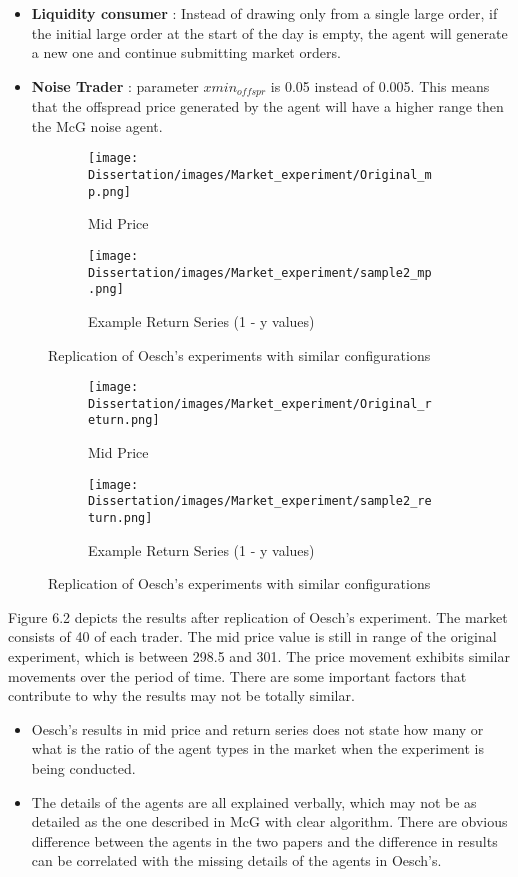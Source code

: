 \begin{itemize}
  \item \textbf{Liquidity consumer} : Instead of drawing only from a single large order, if the initial large order at the start of the day is empty, the agent will generate a new one and continue submitting market orders. 
  \item \textbf{Noise Trader} : parameter $xmin_{offspr}$ is 0.05 instead of 0.005. This means that the offspread price generated by the agent will have a higher range then the McG noise agent. 
\end{itemize}

\begin{figure}[h]
  \begin{subfigure}[b]{0.5\textwidth}
    \texttt{[image: Dissertation/images/Market\_experiment/Original\_mp.png]}
    \caption{Mid Price}
    \label{fig:1}
  \end{subfigure}
  \begin{subfigure}[b]{0.5\textwidth}
    \texttt{[image: Dissertation/images/Market\_experiment/sample2\_mp.png]}
    \caption{Example Return Series (1 - y values)}
    \label{fig:2}
  \end{subfigure}
\caption{Replication of Oesch's experiments with similar configurations} 
\end{figure}

\begin{figure}[h]
  \begin{subfigure}[b]{0.5\textwidth}
    \texttt{[image: Dissertation/images/Market\_experiment/Original\_return.png]}
    \caption{Mid Price}
    \label{fig:1}
  \end{subfigure}
  \begin{subfigure}[b]{0.5\textwidth}
    \texttt{[image: Dissertation/images/Market\_experiment/sample2\_return.png]}
    \caption{Example Return Series (1 - y values)}
    \label{fig:2}
  \end{subfigure}
\caption{Replication of Oesch's experiments with similar configurations} 
\end{figure}

Figure 6.2 depicts the results after replication of Oesch's experiment. The market consists of 40 of each trader. The mid price value is still in range of the original experiment, which is between 298.5 and 301. The price movement exhibits similar movements over the period of time. There are some important factors that contribute to why the results may not be totally similar. 

\begin{itemize}
  \item Oesch's results in mid price and return series does not state how many or what is the ratio of the agent types in the market when the experiment is being conducted.
  \item The details of the agents are all explained verbally, which may not be as detailed as the one described in McG with clear algorithm. There are obvious difference between the agents in the two papers and the difference in results can be correlated with the missing details of the agents in Oesch's. 
\end{itemize}